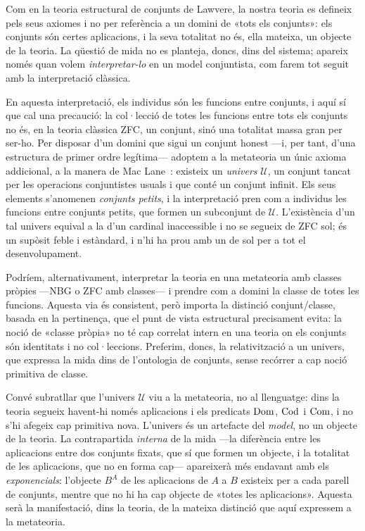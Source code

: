 \begin{observacio}\label{obs:mida-univers}
Com en la teoria estructural de conjunts de Lawvere, la nostra teoria es defineix pels seus axiomes i no per referència a un domini de «tots els conjunts»: els conjunts són certes aplicacions, i la seva totalitat no és, ella mateixa, un objecte de la teoria. La qüestió de mida no es planteja, doncs, dins del sistema; apareix només quan volem \emph{interpretar-lo} en un model conjuntista, com farem tot seguit amb la interpretació clàssica.

En aquesta interpretació, els individus són les funcions entre conjunts, i aquí sí que cal una precaució: la col·lecció de totes les funcions entre tots els conjunts no és, en la teoria clàssica \textsf{ZFC}, un conjunt, sinó una totalitat massa gran per ser-ho. Per disposar d'un domini que sigui un conjunt honest ---i, per tant, d'una estructura de primer ordre legítima--- adoptem a la metateoria un únic axioma addicional, a la manera de Mac Lane~\cite{maclane-moerdijk,shulman-sets}: existeix un \emph{univers} \(\mathcal U\), un conjunt tancat per les operacions conjuntistes usuals i que conté un conjunt infinit. Els seus elements s'anomenen \emph{conjunts petits}, i la interpretació pren com a individus les funcions entre conjunts petits, que formen un subconjunt de \(\mathcal U\). L'existència d'un tal univers equival a la d'un cardinal inaccessible i no se segueix de \textsf{ZFC} sol; és un supòsit feble i estàndard, i n'hi ha prou amb un de sol per a tot el desenvolupament.

Podríem, alternativament, interpretar la teoria en una metateoria amb classes pròpies ---\textsf{NBG} o \textsf{ZFC} amb classes--- i prendre com a domini la classe de totes les funcions. Aquesta via és consistent, però importa la distinció conjunt/classe, basada en la pertinença, que el punt de vista estructural precisament evita: la noció de «classe pròpia» no té cap correlat intern en una teoria on els conjunts són identitats i no col·leccions. Preferim, doncs, la relativització a un univers, que expressa la mida dins de l'ontologia de conjunts, sense recórrer a cap noció primitiva de classe.

Convé subratllar que l'univers \(\mathcal U\) viu a la metateoria, no al llenguatge: dins la teoria segueix havent-hi només aplicacions i els predicats \(\operatorname{Dom}\), \(\operatorname{Cod}\) i \(\operatorname{Com}\), i no s'hi afegeix cap primitiva nova. L'univers és un artefacte del \emph{model}, no un objecte de la teoria. La contrapartida \emph{interna} de la mida ---la diferència entre les aplicacions entre dos conjunts fixats, que sí que formen un objecte, i la totalitat de les aplicacions, que no en forma cap--- apareixerà més endavant amb els \emph{exponencials}: l'objecte \(B^A\) de les aplicacions de \(A\) a \(B\) existeix per a cada parell de conjunts, mentre que no hi ha cap objecte de «totes les aplicacions». Aquesta serà la manifestació, dins la teoria, de la mateixa distinció que aquí expressem a la metateoria.
\end{observacio}

